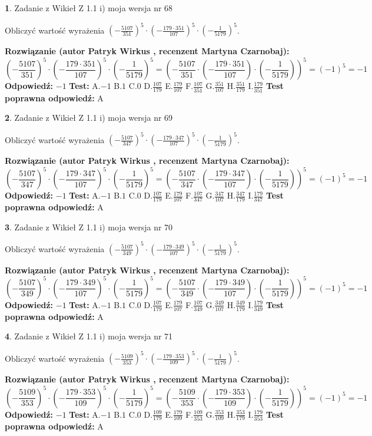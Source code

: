 \documentclass[12pt, a4paper]{article}
\theoremstyle{definition} %
\newtheorem{zad}{}
\newcommand{\zadStart}[1]{\begin{zad}#1\newline}
\newcommand{\zadStop}{\end{zad}}
\newcommand{\rozwStart}[2]{\noindent \textbf{Rozwiązanie (autor #1 , recenzent #2): }\newline}
\newcommand{\rozwStop}{\newline}
\newcommand{\odpStart}{\noindent \textbf{Odpowiedź:}\newline}
\newcommand{\odpStop}{\newline}
\newcommand{\testStart}{\noindent \textbf{Test:}\newline}
\newcommand{\testStop}{\newline}
\newcommand{\kluczStart}{\noindent \textbf{Test poprawna odpowiedź:}\newline}
\newcommand{\kluczStop}{\newline}
\begin{document}
\zadStart{Zadanie z Wikieł Z 1.1 i) moja wersja nr 68}

Obliczyć wartość wyrażenia $(-\frac{5107}{351})^{5} \cdot (-\frac{179 \cdot 351}{107})^{5} \cdot (-\frac{1}{5179})^{5}$.
\zadStop
\rozwStart{Patryk Wirkus}{Martyna Czarnobaj}
$$(-\frac{5107}{351})^{5} \cdot (-\frac{179 \cdot 351}{107})^{5} \cdot (-\frac{1}{5179})^{5} = (-\frac{5107}{351} \cdot (-\frac{179 \cdot 351}{107}) \cdot (-\frac{1}{5179}))^{5} = (-1)^{5} = -1$$
\rozwStop
\odpStart
$-1$
\odpStop
\testStart
A.$-1$ B.$1$ C.$0$ D.$\frac{107}{179}$ E.$\frac{179}{107}$
F.$\frac{107}{351}$ G.$\frac{351}{107}$
H.$\frac{351}{179}$
I.$\frac{179}{351}$
\testStop
\kluczStart
A
\kluczStop



\zadStart{Zadanie z Wikieł Z 1.1 i) moja wersja nr 69}

Obliczyć wartość wyrażenia $(-\frac{5107}{347})^{5} \cdot (-\frac{179 \cdot 347}{107})^{5} \cdot (-\frac{1}{5179})^{5}$.
\zadStop
\rozwStart{Patryk Wirkus}{Martyna Czarnobaj}
$$(-\frac{5107}{347})^{5} \cdot (-\frac{179 \cdot 347}{107})^{5} \cdot (-\frac{1}{5179})^{5} = (-\frac{5107}{347} \cdot (-\frac{179 \cdot 347}{107}) \cdot (-\frac{1}{5179}))^{5} = (-1)^{5} = -1$$
\rozwStop
\odpStart
$-1$
\odpStop
\testStart
A.$-1$ B.$1$ C.$0$ D.$\frac{107}{179}$ E.$\frac{179}{107}$
F.$\frac{107}{347}$ G.$\frac{347}{107}$
H.$\frac{347}{179}$
I.$\frac{179}{347}$
\testStop
\kluczStart
A
\kluczStop



\zadStart{Zadanie z Wikieł Z 1.1 i) moja wersja nr 70}

Obliczyć wartość wyrażenia $(-\frac{5107}{349})^{5} \cdot (-\frac{179 \cdot 349}{107})^{5} \cdot (-\frac{1}{5179})^{5}$.
\zadStop
\rozwStart{Patryk Wirkus}{Martyna Czarnobaj}
$$(-\frac{5107}{349})^{5} \cdot (-\frac{179 \cdot 349}{107})^{5} \cdot (-\frac{1}{5179})^{5} = (-\frac{5107}{349} \cdot (-\frac{179 \cdot 349}{107}) \cdot (-\frac{1}{5179}))^{5} = (-1)^{5} = -1$$
\rozwStop
\odpStart
$-1$
\odpStop
\testStart
A.$-1$ B.$1$ C.$0$ D.$\frac{107}{179}$ E.$\frac{179}{107}$
F.$\frac{107}{349}$ G.$\frac{349}{107}$
H.$\frac{349}{179}$
I.$\frac{179}{349}$
\testStop
\kluczStart
A
\kluczStop



\zadStart{Zadanie z Wikieł Z 1.1 i) moja wersja nr 71}

Obliczyć wartość wyrażenia $(-\frac{5109}{353})^{5} \cdot (-\frac{179 \cdot 353}{109})^{5} \cdot (-\frac{1}{5179})^{5}$.
\zadStop
\rozwStart{Patryk Wirkus}{Martyna Czarnobaj}
$$(-\frac{5109}{353})^{5} \cdot (-\frac{179 \cdot 353}{109})^{5} \cdot (-\frac{1}{5179})^{5} = (-\frac{5109}{353} \cdot (-\frac{179 \cdot 353}{109}) \cdot (-\frac{1}{5179}))^{5} = (-1)^{5} = -1$$
\rozwStop
\odpStart
$-1$
\odpStop
\testStart
A.$-1$ B.$1$ C.$0$ D.$\frac{109}{179}$ E.$\frac{179}{109}$
F.$\frac{109}{353}$ G.$\frac{353}{109}$
H.$\frac{353}{179}$
I.$\frac{179}{353}$
\testStop
\kluczStart
A
\kluczStop
\end{document}
